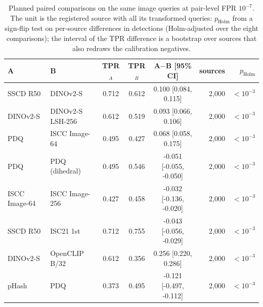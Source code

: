\begin{table}[!t]
\centering
\footnotesize
\caption{Planned paired comparisons on the same image queries at pair-level FPR $10^{-7}$. The unit is the registered source with all its transformed queries: $p_{\mathrm{Holm}}$ from a sign-flip test on per-source differences in detections (Holm-adjusted over the eight comparisons); the interval of the TPR difference is a bootstrap over sources that also redraws the calibration negatives.}
\label{tab:fp-paired}
\setlength{\tabcolsep}{3pt}
\begin{tabular}{llcccrr}
\toprule
A & B & TPR$_A$ & TPR$_B$ & A$-$B [95\% CI] & sources & $p_{\mathrm{Holm}}$ \\
\midrule
SSCD R50 & DINOv2-S & 0.712 & 0.612 & 0.100 \tiny[0.084, 0.115] & 2{,}000 & $<10^{-3}$ \\
DINOv2-S & DINOv2-S LSH-256 & 0.612 & 0.519 & 0.093 \tiny[0.066, 0.106] & 2{,}000 & $<10^{-3}$ \\
PDQ & ISCC Image-64 & 0.495 & 0.427 & 0.068 \tiny[0.058, 0.175] & 2{,}000 & $<10^{-3}$ \\
PDQ & PDQ (dihedral) & 0.495 & 0.546 & -0.051 \tiny[-0.055, -0.050] & 2{,}000 & $<10^{-3}$ \\
ISCC Image-64 & ISCC Image-256 & 0.427 & 0.458 & -0.032 \tiny[-0.136, -0.020] & 2{,}000 & $<10^{-3}$ \\
SSCD R50 & ISC21 1st & 0.712 & 0.755 & -0.043 \tiny[-0.056, -0.029] & 2{,}000 & $<10^{-3}$ \\
DINOv2-S & OpenCLIP B/32 & 0.612 & 0.356 & 0.256 \tiny[0.220, 0.286] & 2{,}000 & $<10^{-3}$ \\
pHash & PDQ & 0.373 & 0.495 & -0.121 \tiny[-0.497, -0.112] & 2{,}000 & $<10^{-3}$ \\
\bottomrule
\end{tabular}

\end{table}

